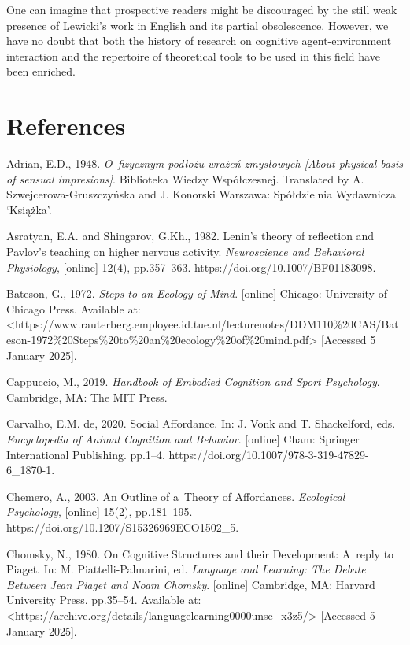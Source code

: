 One can imagine that prospective readers might be discouraged by the still weak presence of Lewicki's work in English and its partial obsolescence. However, we have no doubt that both the history of research on cognitive agent-environment interaction and the repertoire of theoretical tools to be used in this field have been enriched.



\section*{References}

Adrian, E.D., 1948. \textit{O~fizycznym podłożu wrażeń zmysłowych [About physical basis of sensual impresions]}. Biblioteka Wiedzy Współczesnej. Translated by A. Szwejcerowa-Gruszczyńska and J. Konorski Warszawa: Spółdzielnia Wydawnicza ‘Książka'.



Asratyan, E.A. and Shingarov, G.Kh., 1982. Lenin's theory of reflection and Pavlov's teaching on higher nervous activity. \textit{Neuroscience and Behavioral Physiology}, [online] 12(4), pp.357–363. https://doi.org/10.1007/BF01183098.



Bateson, G., 1972. \textit{Steps to an Ecology of Mind}. [online] Chicago: University of Chicago Press. Available at: {\textless}https://www.rauterberg.employee.id.tue.nl/lecturenotes/DDM110\%20CAS/Bateson-1972\%20Steps\%20to\%20an\%20ecology\%20of\%20mind.pdf{\textgreater} [Accessed 5 January 2025].



Cappuccio, M., 2019. \textit{Handbook of Embodied Cognition and Sport Psychology}. Cambridge, MA: The MIT Press.



Carvalho, E.M. de, 2020. Social Affordance. In: J. Vonk and T. Shackelford, eds. \textit{Encyclopedia of Animal Cognition and Behavior}. [online] Cham: Springer International Publishing. pp.1–4. https://doi.org/10.1007/978-3-319-47829-6\_1870-1.



Chemero, A., 2003. An Outline of a~Theory of Affordances. \textit{Ecological Psychology}, [online] 15(2), pp.181–195. https://doi.org/10.1207/S15326969ECO1502\_5.



Chomsky, N., 1980. On Cognitive Structures and their Development: A~reply to Piaget. In: M. Piattelli-Palmarini, ed. \textit{Language and Learning: The Debate Between Jean Piaget and Noam Chomsky}. [online] Cambridge, MA: Harvard University Press. pp.35–54. Available at: {\textless}https://archive.org/details/languagelearning0000unse\_x3z5/{\textgreater} [Accessed 5 January 2025].



